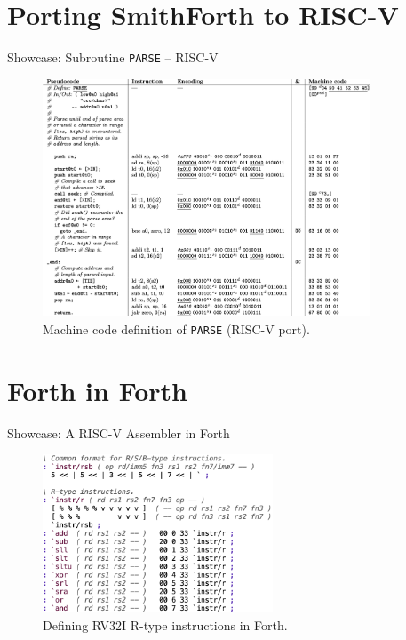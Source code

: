 \documentclass[presentation, bigger]{beamer}
\begin{document}
\section{Porting SmithForth to RISC-V}
\label{sec:orgee58550}

\begin{frame}[label={sec:org3ff56d8},fragile]{Showcase: Subroutine \texttt{PARSE} -- RISC-V}
 \begin{figure}[htbp]
\centering
\includegraphics[width=0.87\textwidth]{img/presentation/PARSE-riscv.png}
\caption{Machine code definition of \texttt{PARSE} (RISC-V port).}
\end{figure}
\end{frame}


\section{Forth in Forth}
\label{sec:org5a8e7ae}

\begin{frame}[label={sec:orgd230fdc}]{Showcase: A RISC-V Assembler in Forth}
\begin{figure}[htbp]
\centering
\includegraphics[width=0.61\textwidth]{img/presentation/forth-assembler.png}
\caption{Defining RV32I R-type instructions in Forth.}
\end{figure}
\end{frame}
\end{document}
